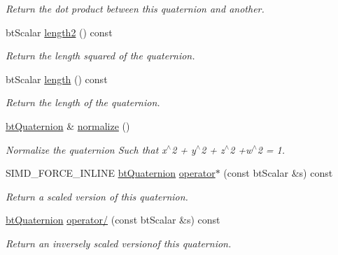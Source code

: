 \begin{DoxyCompactItemize}
\begin{DoxyCompactList}\small\item\em Return the dot product between this quaternion and another. \end{DoxyCompactList}\item 
\mbox{\label{classbtQuaternion_a9266520d0fcd21c667adf870a8a75256}} 
bt\+Scalar \hyperlink{classbtQuaternion_a9266520d0fcd21c667adf870a8a75256}{length2} () const
\begin{DoxyCompactList}\small\item\em Return the length squared of the quaternion. \end{DoxyCompactList}\item 
\mbox{\label{classbtQuaternion_a29bd11309609ea6734a17388a27eda75}} 
bt\+Scalar \hyperlink{classbtQuaternion_a29bd11309609ea6734a17388a27eda75}{length} () const
\begin{DoxyCompactList}\small\item\em Return the length of the quaternion. \end{DoxyCompactList}\item 
\mbox{\label{classbtQuaternion_adb5cd1eb8145a906f9f47857c498d3d6}} 
\hyperlink{classbtQuaternion}{bt\+Quaternion} \& \hyperlink{classbtQuaternion_adb5cd1eb8145a906f9f47857c498d3d6}{normalize} ()
\begin{DoxyCompactList}\small\item\em Normalize the quaternion Such that x$^\wedge$2 + y$^\wedge$2 + z$^\wedge$2 +w$^\wedge$2 = 1. \end{DoxyCompactList}\item 
S\+I\+M\+D\+\_\+\+F\+O\+R\+C\+E\+\_\+\+I\+N\+L\+I\+NE \hyperlink{classbtQuaternion}{bt\+Quaternion} \hyperlink{classbtQuaternion_a1a51cec25a155357f09641510886dbf9}{operator$\ast$} (const bt\+Scalar \&s) const
\begin{DoxyCompactList}\small\item\em Return a scaled version of this quaternion. \end{DoxyCompactList}\item 
\hyperlink{classbtQuaternion}{bt\+Quaternion} \hyperlink{classbtQuaternion_a02e9c919f808155f106be11ba4cee226}{operator/} (const bt\+Scalar \&s) const
\begin{DoxyCompactList}\small\item\em Return an inversely scaled versionof this quaternion. \end{DoxyCompactList}\item 

\end{DoxyCompactItemize}
